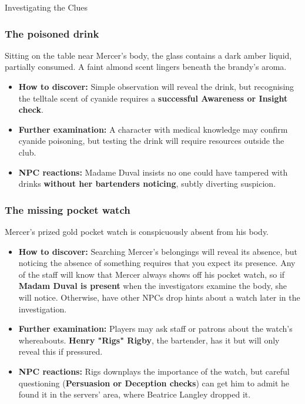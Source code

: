 

\begin{WyrdComment}{Investigating the Clues}
	\subsubsection*{The poisoned drink}
	Sitting on the table near Mercer’s body, the glass contains a dark amber liquid, partially consumed. A faint almond scent lingers beneath the brandy’s aroma.  
	\begin{itemize}
		\item \textbf{How to discover:} Simple observation will reveal the drink, but recognising the telltale scent of cyanide requires a \textbf{successful Awareness or Insight check}.
		\item \textbf{Further examination:} A character with medical knowledge may confirm cyanide poisoning, but testing the drink will require resources outside the club.
		\item \textbf{NPC reactions:} Madame Duval insists no one could have tampered with drinks \textbf{without her bartenders noticing}, subtly diverting suspicion.
	\end{itemize}
	
	\subsubsection*{The missing pocket watch}
	Mercer’s prized gold pocket watch is conspicuously absent from his body. 
	\begin{itemize}
		\item \textbf{How to discover:} Searching Mercer’s belongings will reveal its absence, but noticing the absence of something requires that you expect its presence. Any of the staff will know that Mercer always shows off his pocket watch, so if \textbf{Madam Duval is present} when the investigators examine the body, she will notice. Otherwise, have other NPCs drop hints about a watch later in the investigation.
		\item \textbf{Further examination:} Players may ask staff or patrons about the watch’s whereabouts. \textbf{Henry "Rigs" Rigby}, the bartender, has it but will only reveal this if pressured.
		\item \textbf{NPC reactions:} Rigs downplays the importance of the watch, but careful questioning (\textbf{Persuasion or Deception checks}) can get him to admit he found it in the servers’ area, where Beatrice Langley dropped it.
	\end{itemize}
	

\end{WyrdComment}
